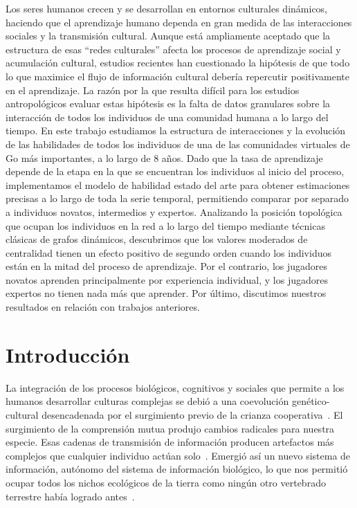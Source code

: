 \documentclass[a4paper,11pt]{book}
\theoremstyle{definition}
\begin{document}
Los seres humanos crecen y se desarrollan en entornos culturales din\'amicos, haciendo que el aprendizaje humano dependa en gran medida de las interacciones sociales y la transmisi\'on cultural.
%
Aunque est\'a ampliamente aceptado que la estructura de esas ``redes culturales'' afecta los procesos de aprendizaje social y acumulaci\'on cultural, estudios recientes han cuestionado la hip\'otesis de que todo lo que maximice el flujo de informaci\'on cultural deber\'ia repercutir positivamente en el aprendizaje.
%
La raz\'on por la que resulta dif\'icil para los estudios antropol\'ogicos evaluar estas hip\'otesis es la falta de datos granulares sobre la interacci\'on de todos los individuos de una comunidad humana a lo largo del tiempo.
%
En este trabajo estudiamos la estructura de interacciones y la evoluci\'on de las habilidades de todos los individuos de una de las comunidades virtuales de Go m\'as importantes, a lo largo de 8 a\~nos.
%
Dado que la tasa de aprendizaje depende de la etapa en la que se encuentran los individuos al inicio del proceso, implementamos el modelo de habilidad estado del arte para obtener estimaciones precisas a lo largo de toda la serie temporal, permitiendo comparar por separado a individuos novatos, intermedios y expertos.
%
Analizando la posici\'on topol\'ogica que ocupan los individuos en la red a lo largo del tiempo mediante t\'ecnicas cl\'asicas de grafos din\'amicos, descubrimos que los valores moderados de centralidad tienen un efecto positivo de segundo orden cuando los individuos est\'an en la mitad del proceso de aprendizaje.
%
Por el contrario, los jugadores novatos aprenden principalmente por experiencia individual, y los jugadores expertos no tienen nada m\'as que aprender.
%
Por \'ultimo, discutimos nuestros resultados en relaci\'on con trabajos anteriores.

\section{Introducci\'on}

La integraci\'on de los procesos biol\'ogicos, cognitivos y sociales que permite a los humanos desarrollar culturas complejas se debi\'o a una coevoluci\'on gen\'etico-cultural desencadenada por el surgimiento previo de la crianza cooperativa~\cite{Hrdy2020,Koster2020}.
%
El surgimiento de la comprensi\'on mutua produjo cambios radicales para nuestra especie.
%
Esas cadenas de transmisi\'on de informaci\'on producen artefactos m\'as complejos que cualquier individuo act\'uan solo~\cite{Derex2015}.
%
Emergi\'o as\'i un nuevo sistema de informaci\'on, aut\'onomo del sistema de informaci\'on biol\'ogico, lo que nos permiti\'o ocupar todos los nichos ecol\'ogicos de la tierra como ning\'un otro vertebrado terrestre hab\'ia logrado antes~\cite{Boyd2011}.
\end{document}
